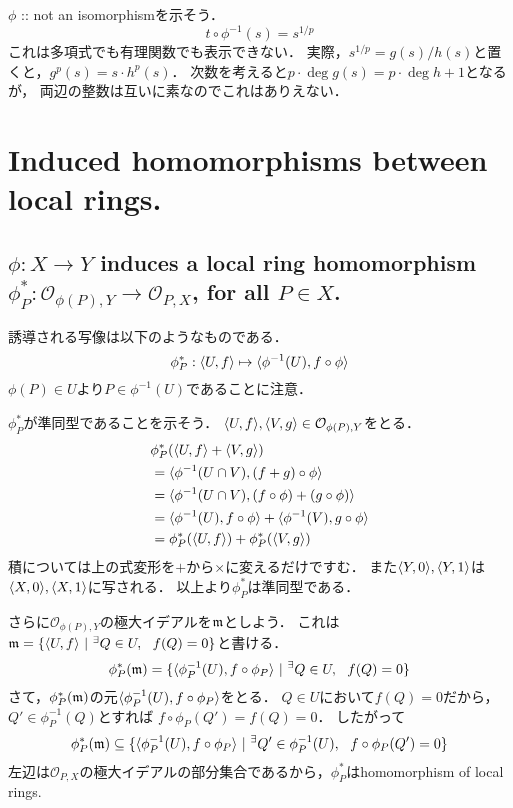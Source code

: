 \documentclass[a4paper]{jarticle}
\begin{document}
    $\phi$ :: not an isomorphismを示そう．
    \[ t \circ \phi^{-1}(s)=s^{1/p} \]
    これは多項式でも有理関数でも表示できない．
    実際，$s^{1/p}=g(s)/h(s)$と置くと，$g^p(s)=s \cdot h^p(s)$．
    次数を考えると$p \cdot \deg g(s)=p \cdot \deg h+1$となるが，
    両辺の整数は互いに素なのでこれはありえない．

\section{Induced homomorphisms between local rings.} %
    \subsection{$\phi: X \to Y$ induces a local ring homomorphism $\phi_P^{\ast}: \mathcal{O}_{\phi(P), Y} \to \mathcal{O}_{P, X}$, for all $P \in X$.}
    誘導される写像は以下のようなものである．
    \[ \phi_P^{\ast}: \langle U,f \rangle \mapsto \langle \phi^{-1}(U),f \circ \phi \rangle \]
    $\phi(P) \in U$より$P \in \phi^{-1}(U)$であることに注意．

    $\phi_P^{\ast}$が準同型であることを示そう．
    $\langle U,f \rangle, \langle V,g \rangle \in \mathcal{O}_{\phi(P), Y}$をとる．
    \begin{align*}
        {}& \phi_P^{\ast}(\langle U,f \rangle+\langle V,g \rangle) \\
        &   =\langle \phi^{-1}(U \cap V),(f+g) \circ \phi \rangle \\
        &   =\langle \phi^{-1}(U \cap V),(f \circ \phi)+(g \circ \phi) \rangle \\
        &   =\langle \phi^{-1}(U),f \circ \phi \rangle+\langle \phi^{-1}(V),g \circ \phi \rangle \\
        &   =\phi_P^{\ast}(\langle U,f \rangle)+\phi_P^{\ast}(\langle V,g \rangle)
    \end{align*}
    積については上の式変形を$+$から$\times$に変えるだけですむ．
    また$\langle Y,0 \rangle, \langle Y,1 \rangle$は$\langle X,0 \rangle, \langle X,1 \rangle$に写される．
    以上より$\phi_P^{\ast}$は準同型である．

    さらに$\mathcal{O}_{\phi(P), Y}$の極大イデアルを$\mathfrak{m}$としよう．
    これは$\mathfrak{m}=\{ \langle U,f \rangle ~|~ {}^{\exists} Q \in U,~~ f(Q)=0 \}$と書ける．
    \[ \phi_P^{\ast}(\mathfrak{m})=\{ \langle \phi_P^{-1}(U),f \circ \phi_P \rangle ~|~ {}^{\exists} Q \in U,~~ f(Q)=0 \} \]
    さて，$\phi_P^{\ast}(\mathfrak{m})$の元$\langle \phi_P^{-1}(U),f \circ \phi_P \rangle$をとる．
    $Q \in U$において$f(Q)=0$だから，$Q' \in \phi_P^{-1}(Q)$とすれば
    $f \circ \phi_P(Q')=f(Q)=0$．
    したがって
    \[ \phi_P^{\ast}(\mathfrak{m}) \subseteq \{ \langle \phi_P^{-1}(U),f \circ \phi_P \rangle ~|~ {}^{\exists} Q' \in \phi_P^{-1}(U),~~ f \circ \phi_P(Q')=0 \} \]
    左辺は$\mathcal{O}_{P, X}$の極大イデアルの部分集合であるから，$\phi_P^{\ast}$はhomomorphism of local rings.
\end{document}
